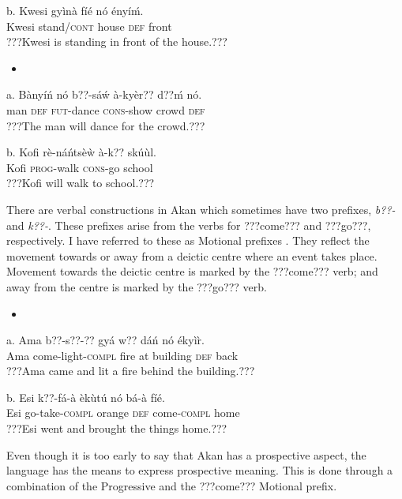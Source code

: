 \documentclass[output=paper]{langsci/langscibook}
\begin{document}
\gll b.  Kwesi  gy\`{i}n\`{a}    f\'{i}\'{e}  n\'{o}  \'{e}ny\'{i}\'{m}.\\
       Kwesi  stand/\textsc{cont}  house  \textsc{def}  front\\
\glt ???Kwesi is standing in front of the house.???
\z

\begin{itemize}
\item \end{itemize}
\gll a.  B\`{a}ny\'{i}\'{n}  n\'{o}  b??-s\'{a}\'{w}   \`{a}-ky\`{e}r??    d??\'{m}  n\'{o}.\\
       man  \textsc{def}  \textsc{fut}{}-dance  \textsc{cons}{}-show  crowd  \textsc{def}\\
\glt   ???The man will dance for the crowd.???
\z

\gll   b.  Kofi  r\`{e}-n\'{a}\'{n}ts\`{e}\`{w}  \`{a}-k??    sk\'{u}\`{u}l.\\
       Kofi  \textsc{prog}{}-walk  \textsc{cons}{}-go  school\\
\glt   ???Kofi will walk to school.???
\z

There are verbal constructions in Akan which sometimes have two prefixes, \emph{b??-} and \emph{k??-}. These prefixes arise from the verbs for ???come??? and ???go???, respectively. I have referred to these as Motional prefixes \citep{Osam2002}. They reflect the movement towards or away from a deictic centre where an event takes place. Movement towards the deictic centre is marked by the ???come??? verb; and away from the centre is marked by the ???go??? verb. 

\begin{itemize}
\item \end{itemize}
\gll a.  Ama  b??-s??-??      gy\'{a}  w??  d\'{a}\'{n}    n\'{o}  \'{e}ky\`{i}\`{r}.\\
       Ama  come-light-\textsc{compl}  fire  at  building  \textsc{def}  back\\
\glt   ???Ama came and lit a fire behind the building.???
\z

\gll  b.  Esi  k??-f\'{a}-\`{a}      \`{e}k\`{u}t\'{u}    n\'{o}  b\'{a}-\`{a}    f\'{i}\'{e}.\\
       Esi  go-take-\textsc{compl}  orange    \textsc{def}  come-\textsc{compl}  home\\
\glt   ???Esi went and brought the things home.???
\z

Even though it is too early to say that Akan has a prospective aspect, the language has the means to express prospective meaning. This is done through a combination of the Progressive and the ???come??? Motional prefix.
\end{document}
